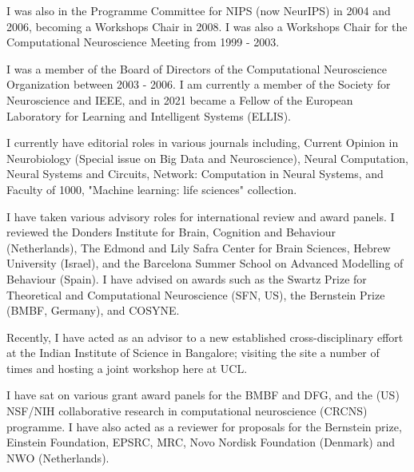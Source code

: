 I was also in the Programme Committee for NIPS (now NeurIPS) in 2004 and 2006, becoming a Workshops Chair in 2008. I was also a Workshops Chair for the Computational Neuroscience Meeting from 1999 - 2003. 

I was a member of the Board of Directors of the Computational Neuroscience Organization between 2003 - 2006. I am currently a member of the Society for Neuroscience and IEEE, and in 2021 became a Fellow of the European Laboratory for Learning and Intelligent Systems (ELLIS). 

I currently have editorial roles in various journals including, Current Opinion in Neurobiology (Special issue on Big Data and Neuroscience), Neural Computation, Neural Systems and Circuits, Network:
Computation in Neural Systems, and Faculty of
1000, "Machine learning: life sciences" collection. 

I have taken various advisory roles for international review and award panels. I reviewed the Donders Institute for Brain, Cognition and Behaviour (Netherlands), The Edmond and Lily Safra Center for Brain Sciences, Hebrew
University (Israel), and the Barcelona Summer School on Advanced Modelling of Behaviour (Spain). I have advised on awards such as the Swartz Prize for Theoretical and Computational Neuroscience (SFN, US), the Bernstein Prize (BMBF, Germany), and COSYNE.

Recently, I have acted as an advisor to a new established cross-disciplinary effort at the Indian Institute of Science in Bangalore; visiting the site a
number of times and hosting a joint workshop here at UCL.

I have sat on various grant award panels for the BMBF and DFG, and the (US) NSF/NIH collaborative research
in computational neuroscience (CRCNS) programme. I have also acted as a reviewer for proposals for the Bernstein prize, Einstein Foundation, EPSRC, MRC, Novo Nordisk Foundation (Denmark) and NWO (Netherlands).




% 
